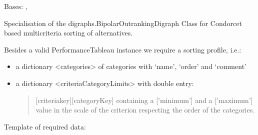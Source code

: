 \documentclass[letterpaper,10pt,english]{sphinxmanual}
\begin{document}
\begin{fulllineitems}
\label{techDoc:sortingDigraphs.SortingDigraph}
Bases: {\hyperref[techDoc:outrankingDigraphs.BipolarOutrankingDigraph]{}}, {\hyperref[techDoc:perfTabs.PerformanceTableau]{}}

Specialisation of the digraphs.BipolarOutrankingDigraph Class
for Condorcet based multicriteria sorting of alternatives.

Besides a valid PerformanceTableau instance we require a sorting profile,
i.e.:
\begin{itemize}
\item {} 
a dictionary \textless{}categories\textgreater{} of categories with `name', `order' and `comment'

\item {} 
a dictionary \textless{}criteriaCategoryLimits\textgreater{} with double entry:
\begin{quote}

{[}criteriakey{]}{[}categoryKey{]} containing a {[}'minimum'{]} and
a  {[}'maximum'{]} value in the scale of the criterion
respecting the order of the categories.
\end{quote}

\end{itemize}

Template of required data:


\end{fulllineitems}
\end{document}
